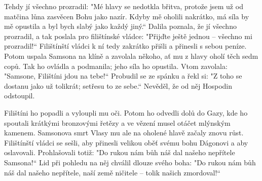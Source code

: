\documentclass{article}
\begin{document}
Tehdy jí všechno prozradil: "Mé hlavy se nedotkla břitva, protože jsem už od matčina lůna zasvěcen Bohu jako nazír. Kdyby mě oholili nakrátko, má síla by mě opustila a byl bych slabý jako každý jiný.“
Dalila poznala, že jí všechno prozradil, a tak poslala pro filištínské vládce: "Přijďte ještě jednou – všechno mi prozradil!“ Filištínští vládci k ní tedy zakrátko přišli a přinesli s sebou peníze. Potom uspala Samsona na klíně a zavolala někoho, ať mu z hlavy oholí těch sedm copů. Tak ho ovládla a podmanila; jeho síla ho opustila.
Vtom zavolala: "Samsone, Filištíni jdou na tebe!“
Probudil se ze spánku a řekl si: "Z toho se dostanu jako už tolikrát; setřesu to ze sebe.“ Nevěděl, že od něj Hospodin odstoupil.
\medskip
\par Filištíni ho popadli a vyloupli mu oči. Potom ho odvedli dolů do Gazy, kde ho spoutali krátkými bronzovými řetězy a ve vězení musel otáčet mlýnským kamenem.
Samsonova smrt
Vlasy mu ale na oholené hlavě začaly znovu růst.
Filištínští vládci se sešli, aby přinesli velikou oběť svému bohu Dágonovi a aby oslavovali. Prohlašovali totiž:
"Do rukou nám bůh náš dal
našeho nepřítele Samsona!“
Lid při pohledu na něj chválil dlouze svého boha:
"Do rukou nám bůh náš dal
našeho nepřítele,
naší země ničitele –
tolik našich zmordoval!“
\end{document}
